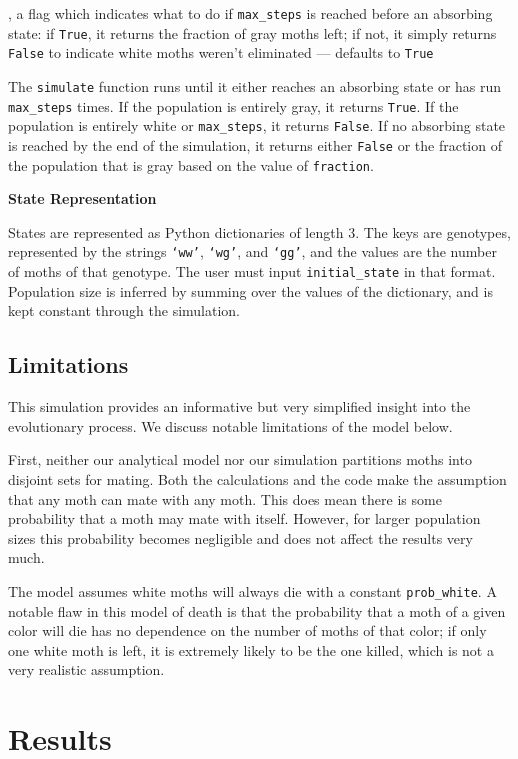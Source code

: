 \documentclass[leqno]{article}
\begin{document}
, a flag which indicates what to do if {\tt max\_steps} is reached before an absorbing state: if {\tt True}, it returns the fraction of gray moths left; if not, it simply returns {\tt False} to indicate white moths weren't eliminated --- defaults to {\tt True}

The {\tt simulate} function runs until it either reaches an absorbing state or has run {\tt max\_steps} times. If the population is entirely gray, it returns {\tt True}. If the population is entirely white or {\tt max\_steps}, it returns {\tt False}. If no absorbing state is reached by the end of the simulation, it returns either {\tt False} or the fraction of the population that is gray based on the value of {\tt fraction}.

\textbf{State Representation}

States are represented as Python dictionaries of length $3$. The keys are genotypes, represented by the strings {\tt `ww'}, {\tt `wg'}, and {\tt `gg'}, and the values are the number of moths of that genotype. The user must input {\tt initial\_state} in that format. Population size is inferred by summing over the values of the dictionary, and is kept constant through the simulation.

\subsection{Limitations}

This simulation provides an informative but very simplified insight into the evolutionary process. We discuss notable limitations of the model below.

First, neither our analytical model nor our simulation partitions moths into disjoint sets for mating. Both the calculations and the code make the assumption that any moth can mate with any moth. This does mean there is some probability that a moth may mate with itself. However, for larger population sizes this probability becomes negligible and does not affect the results very much.

The model assumes white moths will always die with a constant {\tt prob\_white}. A notable flaw in this model of death is that the probability that a moth of a given color will die has no dependence on the number of moths of that color; if only one white moth is left, it is extremely likely to be the one killed, which is not a very realistic assumption.

\newpage

\section{Results}
\end{document}
